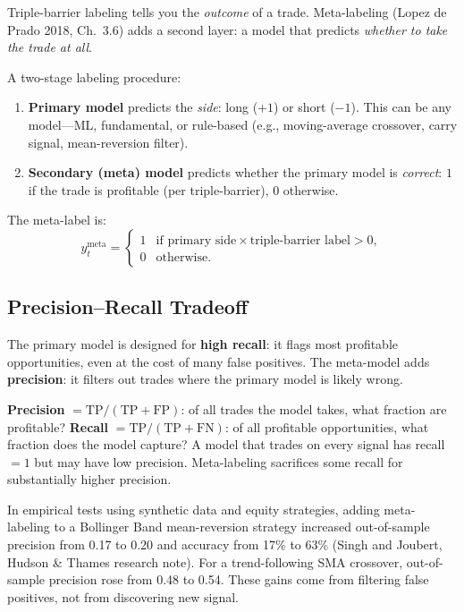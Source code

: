 Triple-barrier labeling tells you the \emph{outcome} of a trade.
Meta-labeling (Lopez de Prado 2018, Ch.~3.6) adds a second layer:
a model that predicts \emph{whether to take the trade at all}.

\begin{definition}
A two-stage labeling procedure:
\begin{enumerate}[leftmargin=2em]
\item \textbf{Primary model} predicts the \emph{side}: long ($+1$) or short ($-1$).
This can be any model---ML, fundamental, or rule-based
(e.g., moving-average crossover, carry signal, mean-reversion filter).
\item \textbf{Secondary (meta) model} predicts whether the primary model is
\emph{correct}: $1$ if the trade is profitable (per triple-barrier), $0$ otherwise.
\end{enumerate}
The meta-label is:
\[
y^{\text{meta}}_t =
\begin{cases}
1 & \text{if primary side} \times \text{triple-barrier label} > 0, \\
0 & \text{otherwise.}
\end{cases}
\]
\end{definition}

\subsection{Precision--Recall Tradeoff}

The primary model is designed for \textbf{high recall}: it flags most
profitable opportunities, even at the cost of many false positives.
The meta-model adds \textbf{precision}: it filters out trades where
the primary model is likely wrong.

\begin{prereq}
\textbf{Precision} $= \text{TP} / (\text{TP} + \text{FP})$: of all trades the model takes,
what fraction are profitable?
\textbf{Recall} $= \text{TP} / (\text{TP} + \text{FN})$: of all profitable opportunities,
what fraction does the model capture?
A model that trades on every signal has recall $= 1$ but may have
low precision.
Meta-labeling sacrifices some recall for substantially higher precision.
\end{prereq}

In empirical tests using synthetic data and equity strategies, adding
meta-labeling to a Bollinger Band mean-reversion strategy increased
out-of-sample precision from 0.17 to 0.20 and accuracy from 17\% to
63\% (Singh and Joubert, Hudson \& Thames research note).
For a trend-following SMA crossover, out-of-sample precision rose from
0.48 to 0.54.
These gains come from filtering false positives, not from discovering
new signal.

